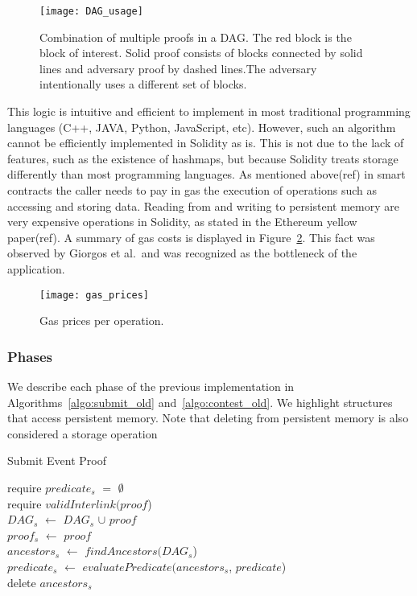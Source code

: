 \begin{figure}[hbt]
    \centering
    \texttt{[image: DAG\_usage]}
    \caption{Combination of multiple proofs in a DAG. The red block is the
        block of interest. Solid proof consists of blocks connected by solid
        lines and adversary proof by dashed lines.The adversary intentionally
        uses a different set of blocks.}
    \label{fig:DAG_usage}
\end{figure}

This logic is intuitive and efficient to implement in most traditional
programming languages (C++, JAVA, Python, JavaScript, etc). However, such an
algorithm cannot be efficiently implemented in Solidity as is. This is not
due to the lack of features, such as the existence of hashmaps, but because
Solidity treats storage differently than most programming languages. As
mentioned above(ref) in smart contracts the caller needs to pay in gas the
execution of operations such as accessing and storing data. Reading from and
writing to persistent memory are very expensive operations in Solidity, as
stated in the Ethereum yellow paper(ref). A summary of gas costs is displayed
in Figure~\ref{fig:gas_prices}. This fact was observed by Giorgos et al.\ and
was recognized as the bottleneck of the application.

\begin{figure}[hbt]
    \centering
    \texttt{[image: gas\_prices]}
    \caption{Gas prices per operation.}
    \label{fig:gas_prices}
\end{figure}

\subsubsection{Phases}

We describe each phase of the previous implementation in
Algorithms~\ref{algo:submit_old} and~\ref{algo:contest_old}. We highlight
structures that access persistent memory. Note that deleting from persistent
memory is also considered a storage operation

\begin{algorithm}
    \caption{Submit Event Proof}
    \label{algo:submit_old}
    require $predicate_{s}$ $=$ $\emptyset$ \\
    require $validInterlink(proof$) \\
    $DAG_{s}$ $\leftarrow$ $DAG_{s}$ $\cup$ $proof$\\
    $proof_{s}$ $\leftarrow$ $proof$\\
    $ancestors_{s}$ $\leftarrow$ $findAncestors(DAG_{s}$)\\
    $predicate_{s}$ $\leftarrow$ $evaluatePredicate(ancestors_{s}$,
    $predicate$)\\
    delete $ancestors_{s}$\\
\end{algorithm}

